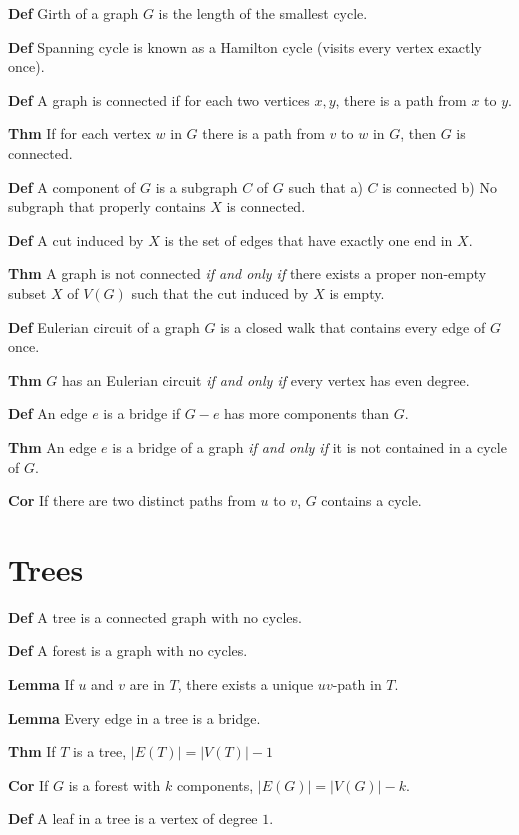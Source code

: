 \documentclass{article}
\begin{document}
\textbf{Def} Girth of a graph $G$ is the length of the smallest cycle. 

\textbf{Def} Spanning cycle is known as a Hamilton cycle (visits every vertex exactly once). 

\textbf{Def} A graph is connected if for each two vertices $x,y$, there is a path from $x$ to $y$. 

\textbf{Thm} If for each vertex $w$ in $G$ there is a path from $v$ to $w$ in $G$, then $G$ is connected. 

\textbf{Def} A component of $G$ is a subgraph $C$ of $G$ such that 
a) $C$ is connected
b) No subgraph that properly contains $X$ is connected.

\textbf{Def} A cut induced by $X$ is the set of edges that have exactly one end in $X$. 

\textbf{Thm} A graph is not connected \textit{if and only if} there exists a proper non-empty subset $X$ of $V(G)$ such that the cut induced by $X$ is empty. 

\textbf{Def} Eulerian circuit of a graph $G$ is a closed walk that contains every edge of $G$ once. 

\textbf{Thm} $G$ has an Eulerian circuit \textit{if and only if} every vertex has even degree. 

\textbf{Def} An edge $e$ is a bridge if $G - e$ has more components than $G$. 

\textbf{Thm} An edge $e$ is a bridge of a graph \textit{if and only if} it is not contained in a cycle of $G$. 

\textbf{Cor} If there are two distinct paths from $u$ to $v$, $G$ contains a cycle. 

\section{Trees}

\textbf{Def} A tree is a connected graph with no cycles.

\textbf{Def} A forest is a graph with no cycles. 

\textbf{Lemma} If $u$ and $v$ are in $T$, there exists a unique $uv$-path in $T$. 

\textbf{Lemma} Every edge in a tree is a bridge. 

\textbf{Thm} If $T$ is a tree, $|E(T)| = |V(T)|-1$

\textbf{Cor} If $G$ is a forest with $k$ components, $|E(G)| = |V(G)| - k$.

\textbf{Def} A leaf in a tree is a vertex of degree $1$. 
\end{document}
